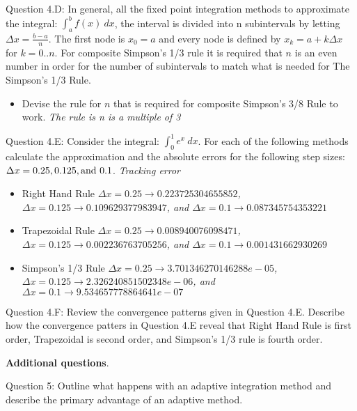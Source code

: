 \documentclass{article}
\def\ds{\displaystyle}
\begin{document}
  \medskip \par \noindent
%
Question 4.D: In general, all the fixed point integration methods to approximate the integral: $\ds \int_a^b f(x) \ dx$, the interval is divided into n subintervals by letting $\ds \Delta x = \frac {b-a}n$. The first node is $\ds x_0 = a$ and every node is defined by $\ds x_k = a + k\Delta x$ for $k=0..n$. For composite Simpson's 1/3 rule it is required that $n$ is an even number in order for the number of subintervals to match what is needed for The Simpson's 1/3 Rule. 
\begin{itemize}
    \item Devise the rule for $n$ that is required for composite Simpson's 3/8 Rule to work. {\it \color{teal} The rule is n is a multiple of 3}
\end{itemize}
\medskip \par \noindent
%
Question 4.E: Consider the integral: $\ds \int_0^1 e^x \ dx$. For each of the following methods calculate the approximation and the absolute errors for the following step sizes: $\ds \Delta x = 0.25, 0.125, {\rm and} \ 0.1$. {\it \color{teal}Tracking error}
\begin{itemize}
    \item Right Hand Rule {\it \color{teal} $\Delta x = 0.25 \rightarrow 0.223725304655852 $, $\Delta x = 0.125 \rightarrow 0.109629377983947$, and  $ \Delta x = 0.1 \rightarrow  0.087345754353221$ }
    \item Trapezoidal Rule {\it \color{teal}$\Delta x= 0.25 \rightarrow 0.008940076098471$, $\Delta x= 0.125 \rightarrow 0.002236763705256$, and $\Delta x = 0.1 \rightarrow  0.001431662930269$}
    \item Simpson's 1/3 Rule {\it \color{teal} $\Delta x = 0.25 \rightarrow 3.701346270146288e-05$, $\Delta x = 0.125 \rightarrow 2.326240851502348e-06$, and $\Delta x = 0.1 \rightarrow   9.534657778864641e-07 $ }
\end{itemize}
\medskip \par \noindent
%
Question 4.F: Review the convergence patterns given in Question 4.E. Describe how the convergence patters in Question 4.E reveal that Right Hand Rule is first order, Trapezoidal is second order, and Simpson's 1/3 rule is fourth order.  
\medskip \par \noindent
%
{\bf Additional questions}. \medskip \par \noindent
Question 5: Outline what happens with an adaptive integration method and describe the primary advantage of an adaptive method. 
\medskip \par \noindent
\end{document}
